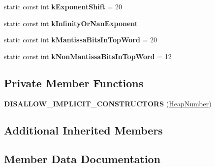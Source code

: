 \begin{DoxyCompactItemize}
\item 
static const int {\bfseries k\+Exponent\+Shift} = 20\hypertarget{classv8_1_1internal_1_1_heap_number_aa70a7fa7eb34d309e4cfac3c2954650b}{}\label{classv8_1_1internal_1_1_heap_number_aa70a7fa7eb34d309e4cfac3c2954650b}

\item 
static const int {\bfseries k\+Infinity\+Or\+Nan\+Exponent}
\item 
static const int {\bfseries k\+Mantissa\+Bits\+In\+Top\+Word} = 20\hypertarget{classv8_1_1internal_1_1_heap_number_a6198e16a781f4aa92fcc8babace8f5ea}{}\label{classv8_1_1internal_1_1_heap_number_a6198e16a781f4aa92fcc8babace8f5ea}

\item 
static const int {\bfseries k\+Non\+Mantissa\+Bits\+In\+Top\+Word} = 12\hypertarget{classv8_1_1internal_1_1_heap_number_af83833ed477b0b07a40419938d43e406}{}\label{classv8_1_1internal_1_1_heap_number_af83833ed477b0b07a40419938d43e406}

\end{DoxyCompactItemize}
\subsection*{Private Member Functions}
\begin{DoxyCompactItemize}
\item 
{\bfseries D\+I\+S\+A\+L\+L\+O\+W\+\_\+\+I\+M\+P\+L\+I\+C\+I\+T\+\_\+\+C\+O\+N\+S\+T\+R\+U\+C\+T\+O\+RS} (\hyperlink{classv8_1_1internal_1_1_heap_number}{Heap\+Number})\hypertarget{classv8_1_1internal_1_1_heap_number_a70e02cebaf65f4e5043f59eaf47c57cc}{}\label{classv8_1_1internal_1_1_heap_number_a70e02cebaf65f4e5043f59eaf47c57cc}

\end{DoxyCompactItemize}
\subsection*{Additional Inherited Members}


\subsection{Member Data Documentation}
